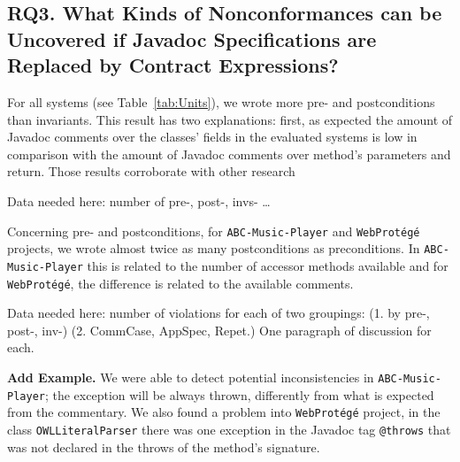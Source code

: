 \subsection{RQ3. What Kinds of Nonconformances can be Uncovered if Javadoc Specifications are Replaced by Contract Expressions?}
\label{rq3}


For all systems (see Table~\ref{tab:Units}), we
wrote more pre- and postconditions than invariants. This result has two
explanations: first, as expected the amount of Javadoc comments over the
classes' fields in the evaluated systems is low in comparison with the amount
of Javadoc comments over method's parameters and return.
Those results corroborate with other research~\cite{} 



Data needed here: number of pre-, post-, invs- \ldots

Concerning pre- and postconditions, for \texttt{ABC-Music-Player} and
\texttt{WebProt\'{e}g\'{e}} projects, we wrote almost twice as many postconditions
as preconditions.
In \texttt{ABC-Music-Player} this is related to the number of accessor methods
available and for \texttt{WebProt\'{e}g\'{e}}, the difference is related to
the available comments.



%


Data needed here: number of violations for each of two groupings:
(1. by pre-, post-, inv-)
(2. CommCase, AppSpec, Repet.)
One paragraph of discussion for each.



\textbf{Add Example. }
We were able to detect potential inconsistencies in \texttt{ABC-Mu\-sic-Player};
the exception will be always thrown, differently from what is expected from the
commentary.
We also found a problem into
\texttt{WebProt\'{e}g\'{e}} project, in the class \texttt{OWLLiteralParser} there was one exception
in the Javadoc tag \texttt{@throws} that was not declared in the throws of the method's signature.


